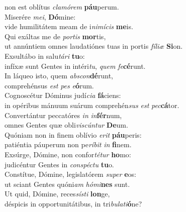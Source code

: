 \evenverse non est oblítus \textit{cla}\textit{mó}\textit{rem} \textbf{páu}perum.\\
\oddverse Miserére \textit{me}\textit{i}, \textbf{Dó}mine:~\*\\
\oddverse vide humilitátem meam de i\textit{ni}\textit{mí}\textit{cis} \textbf{me}is.\\
\evenverse Qui exáltas me de \textit{por}\textit{tis} \textbf{mor}tis,~\*\\
\evenverse ut annúntiem omnes laudatiónes tuas in portis \textit{fí}\textit{li}\textit{æ} \textbf{Si}on.\\
\oddverse Exsultábo in salu\textit{tá}\textit{ri} \textbf{tu}o:~\*\\
\oddverse infíxæ sunt Gentes in intéri\textit{tu}, \textit{quem} \textit{fe}\textbf{cé}runt.\\
\evenverse In láqueo isto, quem \textit{ab}\textit{scon}\textbf{dé}runt,~\*\\
\evenverse comprehénsus \textit{est} \textit{pes} \textit{e}\textbf{ó}rum.\\
\oddverse Cognoscétur Dóminus judí\textit{ci}\textit{a} \textbf{fá}ciens:~\*\\
\oddverse in opéribus mánuum suárum comprehén\textit{sus} \textit{est} \textit{pec}\textbf{cá}tor.\\
\evenverse Convertántur peccatóres \textit{in} \textit{in}\textbf{fér}num,~\*\\
\evenverse omnes Gentes quæ obli\textit{vi}\textit{scún}\textit{tur} \textbf{De}um.\\
\oddverse Quóniam non in finem oblívio \textit{e}\textit{rit} \textbf{páu}peris:~\*\\
\oddverse patiéntia páuperum non pe\textit{rí}\textit{bit} \textit{in} \textbf{fi}nem.\\
\evenverse Exsúrge, Dómine, non confor\textit{té}\textit{tur} \textbf{ho}mo:~\*\\
\evenverse judicéntur Gentes in \textit{con}\textit{spé}\textit{ctu} \textbf{tu}o.\\
\oddverse Constítue, Dómine, legislatórem \textit{su}\textit{per} \textbf{e}os:~\*\\
\oddverse ut sciant Gentes quóni\textit{am} \textit{hó}\textit{mi}\textbf{nes} sunt.\\
\evenverse Ut quid, Dómine, reces\textit{sí}\textit{sti} \textbf{lon}ge,~\*\\
\evenverse déspicis in opportunitátibus, in tri\textit{bu}\textit{la}\textit{ti}\textbf{ó}ne?\\
